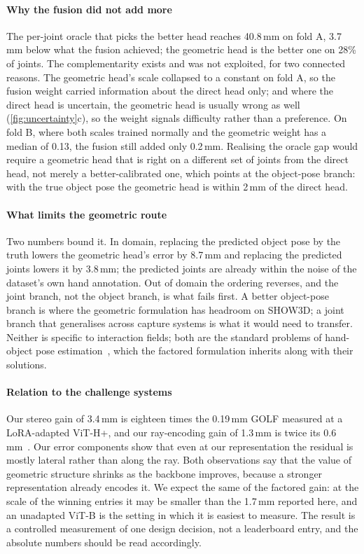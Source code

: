 \paragraph{Why the fusion did not add more}
The per-joint oracle that picks the better head reaches 40.8\,mm on fold A, 3.7\,mm below what the fusion achieved; the geometric head is the better one on 28\% of joints. The complementarity exists and was not exploited, for two connected reasons. The geometric head's scale collapsed to a constant on fold A, so the fusion weight carried information about the direct head only; and where the direct head is uncertain, the geometric head is usually wrong as well (\cref{fig:uncertainty}c), so the weight signals difficulty rather than a preference. On fold B, where both scales trained normally and the geometric weight has a median of 0.13, the fusion still added only 0.2\,mm. Realising the oracle gap would require a geometric head that is right on a different set of joints from the direct head, not merely a better-calibrated one, which points at the object-pose branch: with the true object pose the geometric head is within 2\,mm of the direct head.

\paragraph{What limits the geometric route}
Two numbers bound it. In domain, replacing the predicted object pose by the truth lowers the geometric head's error by 8.7\,mm and replacing the predicted joints lowers it by 3.8\,mm; the predicted joints are already within the noise of the dataset's own hand annotation. Out of domain the ordering reverses, and the joint branch, not the object branch, is what fails first. A better object-pose branch is where the geometric formulation has headroom on SHOW3D; a joint branch that generalises across capture systems is what it would need to transfer. Neither is specific to interaction fields; both are the standard problems of hand-object pose estimation~\cite{fan2024benchmarks,bansal2026hopformer}, which the factored formulation inherits along with their solutions.

\paragraph{Relation to the challenge systems}
Our stereo gain of 3.4\,mm is eighteen times the 0.19\,mm GOLF measured at a LoRA-adapted ViT-H+, and our ray-encoding gain of 1.3\,mm is twice its 0.6\,mm~\cite{zou2026golf}. Our error components show that even at our representation the residual is mostly lateral rather than along the ray. Both observations say that the value of geometric structure shrinks as the backbone improves, because a stronger representation already encodes it. We expect the same of the factored gain: at the scale of the winning entries it may be smaller than the 1.7\,mm reported here, and an unadapted ViT-B is the setting in which it is easiest to measure. The result is a controlled measurement of one design decision, not a leaderboard entry, and the absolute numbers should be read accordingly.

